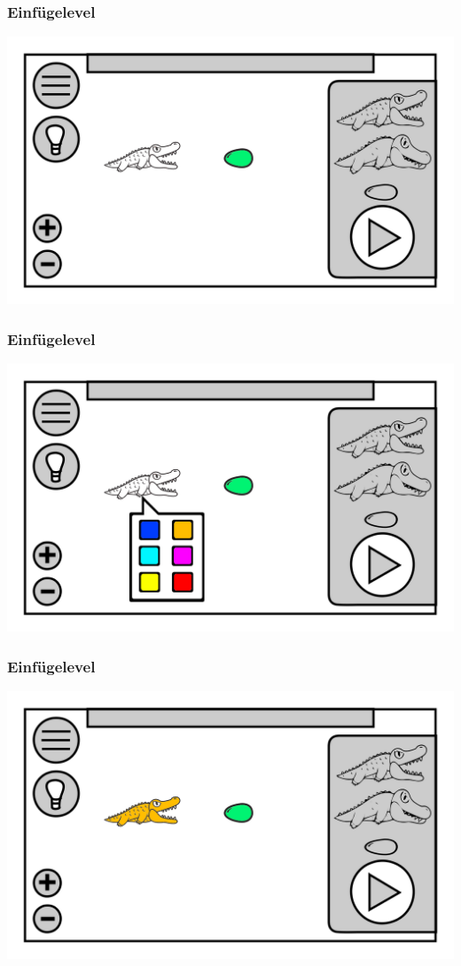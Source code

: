 \documentclass[t]{beamer}
\begin{document}
\begin{frame}
	\frametitle{Einfügelevel}
	\includegraphics[height=\textheight]{level_croc.png}
\end{frame}
\begin{frame}
	\frametitle{Einfügelevel}
	\includegraphics[height=\textheight]{level_color_purple.png}
\end{frame}
\begin{frame}
	\frametitle{Einfügelevel}
	\includegraphics[height=\textheight]{level_colored_croc.png}
\end{frame}
\end{document}
